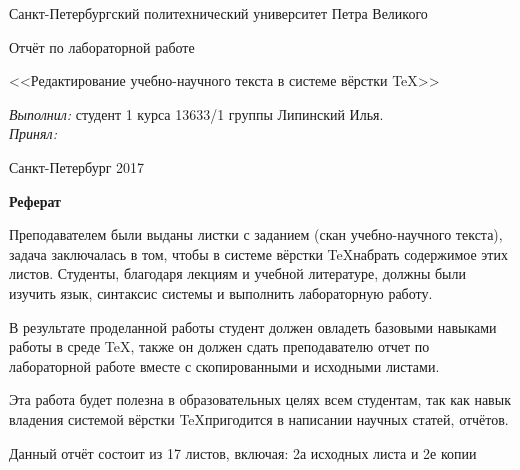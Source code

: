 \documentclass[a4paper,12pt]{article}
\begin{document}
\begin{titlepage}
\newpage
\begin{center}
\large Санкт-Петербургский политехнический университет Петра Великого\\ \hrulefill
\end{center}
\vspace{8em}
\begin{center}
\huge Отчёт по лабораторной работе\\ [10pt]
\end{center}
\vspace{2.5em}
\begin{center}
\large <<Редактирование учебно-научного текста в системе вёрстки \TeX >>\\
\end{center}

\vspace{6em}

\begin{flushleft}
\emph{Выполнил:} студент 1 курса 13633/1 группы Липинский Илья.\\
\vspace{2.5em}
\emph{Принял:}  \\
\end{flushleft}

\vspace{\fill}

\begin{center}
Санкт-Петербург 2017
\end{center}

\end{titlepage}
\newpage
\setcounter{page}{2} 

\begin{flushleft}
{\LARGE \bf Реферат}
\end{flushleft}

\par\medskip
   Преподавателем были выданы листки с заданием (скан учебно-научного текста), задача заключалась в том, чтобы в системе вёрстки \TeX набрать содержимое этих листов. Студенты, благодаря лекциям и учебной литературе, должны были изучить язык, синтаксис системы и выполнить лабораторную работу.
\par\medskip В результате проделанной работы студент должен овладеть базовыми навыками работы в среде \TeX, также он должен сдать преподавателю отчет по лабораторной работе вместе с скопированными и исходными листами. 
\par\medskip Эта работа будет полезна в образовательных целях всем студентам, так как навык владения системой вёрстки \TeX пригодится в написании научных статей, отчётов.
\par\medskip Данный отчёт состоит из 17 листов, включая: 2а исходных листа и 2е копии 
\end{document}
